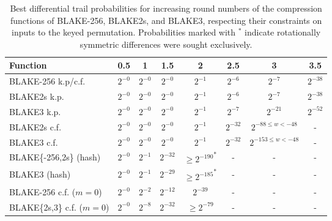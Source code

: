 \documentclass[11pt,notitlepage,a4paper]{article}
\begin{document}
\begin{table}[t]
  \centering
  \caption{Best differential trail probabilities for increasing round numbers of the compression functions of BLAKE-256, BLAKE2s, and BLAKE3, respecting their constraints on inputs to the keyed permutation. Probabilities marked with ${}^\ast$ indicate rotationally symmetric differences were sought exclusively.}%
  \label{tab:trails}
  \begin{tabular}{lccccccc}
    \toprule
    Function                       & 0.5      & 1        & 1.5       & 2                     & 2.5       & 3                               & 3.5        \\ \midrule
    BLAKE-256 k.p/c.f.             & $2^{-0}$ & $2^{-0}$ & $2^{-0}$  & $2^{-1}$              & $2^{-6}$  & $2^{-7}$                        & $2^{-38}$  \\
    BLAKE2s k.p.                   & $2^{-0}$ & $2^{-0}$ & $2^{-0}$  & $2^{-1}$              & $2^{-6}$  & $2^{-7}$                        & $2^{-38}$  \\
    BLAKE3 k.p.                    & $2^{-0}$ & $2^{-0}$ & $2^{-0}$  & $2^{-1}$              & $2^{-7}$  & $2^{-21}$                       & $2^{-52}$  \\
    BLAKE2s c.f.                   & $2^{-0}$ & $2^{-0}$ & $2^{-0}$  & $2^{-1}$              & $2^{-32}$ & $2^{-88\le w < -48}$ & -          \\
    BLAKE3 c.f.                    & $2^{-0}$ & $2^{-0}$ & $2^{-0}$  & $2^{-1}$              & $2^{-32}$ & $2^{-153 \le w < -48}$& -          \\
    BLAKE\{-256,2s\} (hash)        & $2^{-0}$ & $2^{-1}$ & $2^{-32}$ & ${\ge 2^{-190}}^\ast$ & -         & -                               & -          \\ %
    BLAKE3 (hash)                  & $2^{-0}$ & $2^{-1}$ & $2^{-29}$ & ${\ge 2^{-185}}^\ast$ & -         & -                               & -          \\ %
    BLAKE-256 c.f. ($m=0$)         & $2^{-0}$ & $2^{-2}$ & $2^{-12}$ & $2^{-39}$             & -         & -                               & -          \\
    BLAKE\{2s,3\} c.f. ($m=0$)     & $2^{-0}$ & $2^{-8}$ & $2^{-32}$ & ${\ge 2^{-79}}$ & -         & -                               & -          \\ %
    \bottomrule
  \end{tabular}
\end{table}
\end{document}
